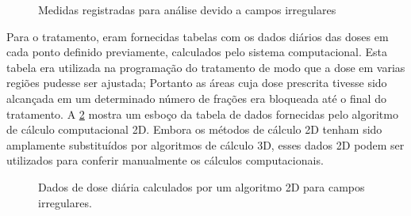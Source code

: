 \documentclass[11pt,a4paper]{article}
\begin{document}
                \begin{figure}[h]
                    \centering
                    \caption{Medidas registradas para análise devido a campos irregulares}
                    \label{fig:distanciasCamposIrregulares}
                \end{figure}

        Para o tratamento, eram fornecidas tabelas com os dados diários das doses em cada ponto definido previamente, calculados pelo sistema computacional. Esta tabela era utilizada na programação do tratamento de modo que a dose em varias regiões pudesse ser ajustada; Portanto as áreas cuja dose prescrita tivesse sido alcançada em um determinado número de frações era bloqueada até o final do tratamento. A \ref{fig:dadoscalc2d} mostra um esboço da tabela de dados fornecidas pelo algoritmo de cálculo computacional 2D. Embora os métodos de cálculo 2D tenham sido amplamente substituídos por algoritmos de cálculo 3D, esses dados 2D podem ser utilizados para conferir manualmente os cálculos computacionais.

        \begin{figure}[h]
            \centering
            \caption{Dados de dose diária calculados por um algoritmo 2D para campos irregulares.}
            \label{fig:dadoscalc2d}
        \end{figure}
\end{document}
